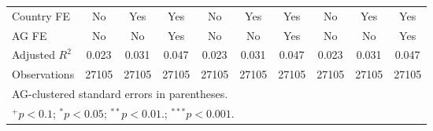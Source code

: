 \begin{table}[htbp]
\begin{tabular}{l*{9}{c}}
Country FE          &          No         &         Yes         &         Yes         &          No         &         Yes         &         Yes         &          No         &         Yes         &         Yes         \\
AG FE               &          No         &          No         &         Yes         &          No         &          No         &         Yes         &          No         &          No         &         Yes         \\
Adjusted $ R^{2} $  &       0.023         &       0.031         &       0.047         &       0.023         &       0.031         &       0.047         &       0.023         &       0.031         &       0.047         \\
Observations        &       27105         &       27105         &       27105         &       27105         &       27105         &       27105         &       27105         &       27105         &       27105         \\
\hline\hline
\multicolumn{10}{l}{\footnotesize AG-clustered standard errors in parentheses.}\\
\multicolumn{10}{l}{\footnotesize $^{+}p<0.1$; $^{*}p<0.05$; $^{**}p<0.01.$; $^{***}p<0.001.$ }\\
\end{tabular}
\end{table}

